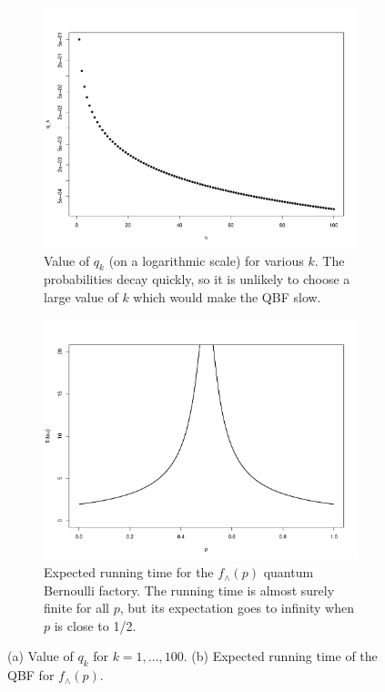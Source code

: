 \documentclass{article}
\theoremstyle{definition}
\begin{document}
\begin{figure}
\centering
\begin{subfigure}{0.45\linewidth}
\centering
\includegraphics[width=\textwidth]{qk_values.pdf}
\caption{Value of $q_k$ (on a logarithmic scale) for various $k$. The probabilities decay quickly, so it is unlikely to choose a large value of $k$ which would make the QBF slow.}
\label{fig:qbf_qk}
\end{subfigure}%
\hfill
\begin{subfigure}{0.45\linewidth}
\centering
\includegraphics[width=\textwidth]{2p_qbf_runtime.pdf}
\caption{Expected running time for the $f_\wedge(p)$ quantum Bernoulli factory. The running time is almost surely finite for all $p$, but its expectation goes to infinity when $p$ is close to 1/2.}
\label{fig:qbf_wedge_runtime}
\end{subfigure}
\caption{(a) Value of $q_k$ for $k=1,\dots, 100$. (b) Expected running time of the QBF for $f_\wedge(p)$.}
\end{figure}
\end{document}
